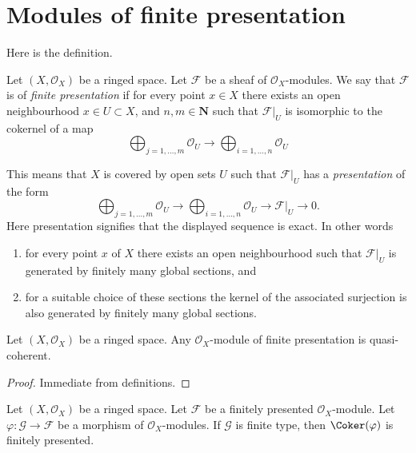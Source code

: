 \section{Modules of finite presentation}
\label{section-finite-presentation}

\noindent
Here is the definition.

\begin{definition}
\label{definition-finite-presentation}
Let $(X, \mathcal{O}_X)$ be a ringed space.
Let $\mathcal{F}$ be a sheaf of $\mathcal{O}_X$-modules.
We say that $\mathcal{F}$ is of {\it finite presentation}
if for every point $x \in X$ there exists an open neighbourhood
$x\in U \subset X$, and  $n, m \in \mathbf{N}$ such that $\mathcal{F}|_U$
is isomorphic to the cokernel of a map
$$
\bigoplus\nolimits_{j = 1, \ldots, m}
\mathcal{O}_U
\longrightarrow
\bigoplus\nolimits_{i = 1, \ldots, n}
\mathcal{O}_U
$$
\end{definition}

\noindent
This means that $X$ is covered by open sets $U$
such that $\mathcal{F}|_U$ has a {\it presentation}
of the form
$$
\bigoplus\nolimits_{j = 1, \ldots, m}
\mathcal{O}_U
\longrightarrow
\bigoplus\nolimits_{i = 1, \ldots, n}
\mathcal{O}_U
\to
\mathcal{F}|_U
\to
0.
$$
Here presentation signifies that the displayed
sequence is exact. In other words
\begin{enumerate}
\item for every point $x$ of $X$ there exists
an open neighbourhood such that $\mathcal{F}|_U$
is generated by finitely many global sections, and
\item for a suitable choice of these sections
the kernel of the associated surjection is also
generated by finitely many global sections.
\end{enumerate}

\begin{lemma}
\label{lemma-finite-presentation-quasi-coherent}
Let $(X, \mathcal{O}_X)$ be a ringed space.
Any $\mathcal{O}_X$-module of finite presentation
is quasi-coherent.
\end{lemma}

\begin{proof}
Immediate from definitions.
\end{proof}

\begin{lemma}
\label{lemma-cokernel-finite-finite-presentation}
Let $(X,\mathcal{O}_X)$ be a ringed space. Let $\mathcal{F}$ be a
finitely presented $\mathcal{O}_X$-module. Let
$\varphi : \mathcal{G} \to \mathcal{F}$ be a morphism of
$\mathcal{O}_X$-modules. If $\mathcal{G}$ is finite type, then
$\Coker(\varphi)$ is finitely presented.
\end{lemma}

